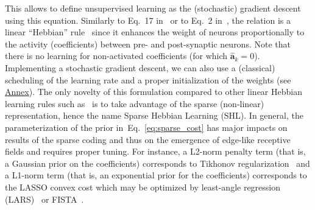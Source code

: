 \documentclass[vision,article,submit,oneauthor,pdftex]{Definitions/mdpi}
\newcommand{\coef}{\mathbf{a}} %
\newcommand{\image}{\mathbf{y}} %
\newcommand{\seeEq}[1]{Eq.~\ref{eq:#1}}%
\begin{document}
This allows to define unsupervised learning as the (stochastic) gradient descent using this equation. Similarly to Eq.~17 in~\citep{Olshausen97} or to Eq.~2 in~\citep{Smith06}, the relation is a linear ``Hebbian'' rule~\citep{Hebb49} since it enhances the weight of neurons proportionally to the activity (coefficients) between pre- and post-synaptic neurons. Note that there is no learning for non-activated coefficients (for which $\hat{\coef}_{k}=0$). Implementing a stochastic gradient descent, we can also use a (classical) scheduling of the learning rate and a proper initialization of the weights (see \href{https://spikeai.github.io/HULK/#Testing-two-different-dictionary-initalization-strategies}{Annex}). The only novelty of this formulation compared to other linear Hebbian learning rules such as~\citep{Oja82} is to take advantage of the sparse (non-linear) representation, hence the name Sparse Hebbian Learning (SHL).
In general, the parameterization of the prior in~\seeEq{sparse_cost} has major impacts on results of the sparse coding and thus on the emergence of edge-like receptive fields and requires proper tuning. For instance, a L2-norm penalty term (that is, a Gaussian prior on the coefficients) corresponds to Tikhonov regularization~\citep{Tikhonov77} and a L1-norm term (that is, an exponential prior for the coefficients) corresponds to the LASSO convex cost which may be optimized by least-angle regression (LARS)~\citep{efron2004least} or FISTA~\citep{beck2009fast}. %
\end{document}

